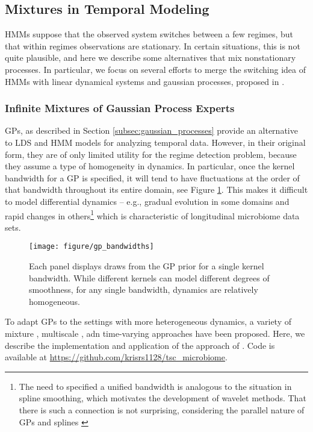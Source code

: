 \documentclass[14pt]{extreport}
\begin{document}
\subsection{Mixtures in Temporal Modeling}

HMMs suppose that the observed system switches between a few regimes, but that
within regimes observations are stationary. In certain situations, this is not
quite plausible, and here we describe some alternatives that mix nonstationary
processes. In particular, we focus on several efforts to merge the switching idea of
HMMs with linear dynamical systems and gaussian processes, proposed in
\citep{ghahramani1998variational, rasmussen2002infinite,
  fox2012multiresolution}.


\subsubsection{Infinite Mixtures of Gaussian Process Experts}
\label{subsec:label}

GPs, as described in Section \ref{subsec:gaussian_processes} provide an
alternative to LDS and HMM models for analyzing temporal data. However, in their
original form, they are of only limited utility for the regime detection
problem, because they assume a type of homogeneity in dynamics. In particular,
once the kernel bandwidth for a GP is specified, it will tend to have
fluctuations at the order of that bandwidth throughout its entire domain, see
Figure \ref{fig:gp_bandwidths}. This makes it difficult to model differential
dynamics -- e.g., gradual evolution in some domains and rapid changes in
others\footnote{The need to specified a unified bandwidth is analogous to the
  situation in spline smoothing, which motivates the development of wavelet
  methods\citep{donoho1995adapting}. That there is such a connection is not
  surprising, considering the parallel nature of GPs and splines
  \citep{kimeldorf1970correspondence}} which is characteristic of longitudinal
microbiome data sets.

\begin{figure}
  \centering
  \texttt{[image: figure/gp\_bandwidths]}
  \caption{Each panel displays draws from the GP prior for a single kernel
    bandwidth. While different kernels can model different degrees of
    smoothness, for any single bandwidth, dynamics are relatively
    homogeneous. \label{fig:gp_bandwidths} }
\end{figure}

To adapt GPs to the settings with more heterogeneous dynamics, a variety of
mixture \citep{tresp2001mixtures, rasmussen2002infinite}, multiscale
\citep{fox2012multiresolution, samostring}, adn time-varying
\citep{paciorek2003nonstationary, heinonen2016non} approaches have been
proposed. Here, we describe the implementation and application of the approach
of \citep{rasmussen2002infinite}. Code is available at
\url{https://github.com/krisrs1128/tsc_microbiome}.
\end{document}
